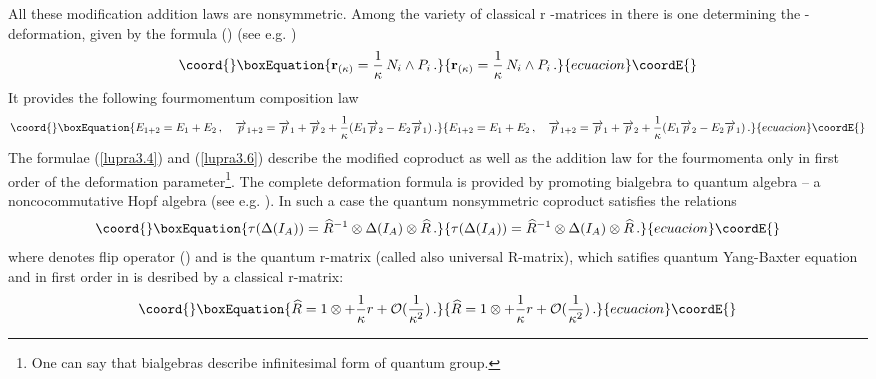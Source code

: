 \documentclass[a4paper,a4paper]{article}
\begin{document}
All these modification addition laws are nonsymmetric. Among the
variety of classical r -matrices in \cite{zak} there is one
determining the \myHighlight{$ \kappa$}\coordHE{}-deformation, given by the formula (\coordHE{}) (see e.g. \cite{mr1})
\begin{equation}\coord{}\boxEquation{\label{lupra3.5}
{\bf r}_{(\kappa)} = \frac{1}{\kappa}\, N_{i} \wedge P_i \, .
}{{\bf r}_{(\kappa)} = \frac{1}{\kappa}\, N_{i} \wedge P_i \, .
}{ecuacion}\coordE{}\end{equation}
It provides the following fourmomentum composition law
\begin{equation}\coord{}\boxEquation{\label{lupra3.6}
E_{1+2} = E_{1} + E_{2} \, , \quad \overrightarrow{p}_{1+2} =
\overrightarrow{p}_{1} +  \overrightarrow{p}_{2} +
\frac{1}{\kappa} ( E_{1} \overrightarrow{p}_{2} - E_{2}
\overrightarrow{p}_{1} )\, .
}{E_{1+2} = E_{1} + E_{2} \, , \quad \overrightarrow{p}_{1+2} =
\overrightarrow{p}_{1} +  \overrightarrow{p}_{2} +
\frac{1}{\kappa} ( E_{1} \overrightarrow{p}_{2} - E_{2}
\overrightarrow{p}_{1} )\, .
}{ecuacion}\coordE{}\end{equation}
The formulae (\ref{lupra3.4}) and (\ref{lupra3.6}) describe the
modified coproduct as well as the addition law for the fourmomenta
only in first order of the deformation parameter\footnote{One can
say that bialgebras describe infinitesimal form of quantum
group.}. The complete deformation formula is provided by promoting
bialgebra to quantum algebra -- a noncocommutative Hopf algebra
(see e.g. \cite{smaj}). In such a case  the quantum nonsymmetric
coproduct satisfies the relations
\begin{equation}\coord{}\boxEquation{\label{lupra3.7}
\tau (\Delta (I_A)) = \widehat{R}^{-1} \otimes \Delta (I_A)
\otimes \widehat{R}\, .
}{\tau (\Delta (I_A)) = \widehat{R}^{-1} \otimes \Delta (I_A)
\otimes \widehat{R}\, .
}{ecuacion}\coordE{}\end{equation}
where \myHighlight{$\tau$}\coordHE{} denotes flip operator (\coordHE{}) and \coordHE{} is the quantum r-matrix (called also
universal R-matrix), which satifies quantum Yang-Baxter equation
and in first order in \coordHE{} is desribed by a classical
r-matrix:
\begin{equation}\coord{}\boxEquation{\label{lupra3.8}
  \widehat{R} = 1 \otimes + \frac{1}{\kappa} r + {\cal O }
  (\frac{1}{\kappa^2})\, .
}{\widehat{R} = 1 \otimes + \frac{1}{\kappa} r + {\cal O }
  (\frac{1}{\kappa^2})\, .
}{ecuacion}\coordE{}\end{equation}
\end{document}
